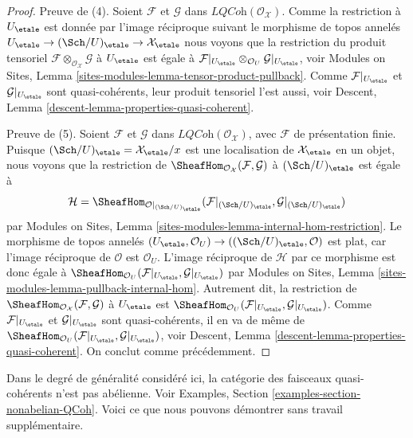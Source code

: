 \begin{proof}
\medskip\noindent
Preuve de (4). Soient $\mathcal{F}$ et $\mathcal{G}$ dans
$\textit{LQCoh}(\mathcal{O}_\mathcal{X})$. Comme la restriction à $U_\etale$
est donnée par l'image réciproque suivant le morphisme de topos annelés
$U_\etale \to (\Sch/U)_\etale \to \mathcal{X}_\etale$
nous voyons que la restriction du produit tensoriel
$\mathcal{F} \otimes_{\mathcal{O}_\mathcal{X}} \mathcal{G}$
à $U_\etale$ est égale à
$\mathcal{F}|_{U_\etale} \otimes_{\mathcal{O}_U} \mathcal{G}|_{U_\etale}$,
voir Modules on Sites, Lemma \ref{sites-modules-lemma-tensor-product-pullback}.
Comme $\mathcal{F}|_{U_\etale}$ et $\mathcal{G}|_{U_\etale}$
sont quasi-cohérents, leur produit tensoriel l'est aussi, voir
Descent, Lemma \ref{descent-lemma-properties-quasi-coherent}.

\medskip\noindent
Preuve de (5). Soient $\mathcal{F}$ et $\mathcal{G}$ dans
$\textit{LQCoh}(\mathcal{O}_\mathcal{X})$, avec $\mathcal{F}$
de présentation finie. Puisque
$(\Sch/U)_\etale = \mathcal{X}_\etale/x$
est une localisation de $\mathcal{X}_\etale$ en un objet,
nous voyons que la restriction de
$\SheafHom_{\mathcal{O}_\mathcal{X}}(\mathcal{F}, \mathcal{G})$
à $(\Sch/U)_\etale$ est égale à
$$
\mathcal{H} =
\SheafHom_{\mathcal{O}|_{(\Sch/U)_\etale}}(
\mathcal{F}|_{(\Sch/U)_\etale}, \mathcal{G}|_{(\Sch/U)_\etale})
$$
par Modules on Sites, Lemma \ref{sites-modules-lemma-internal-hom-restriction}.
Le morphisme de topos annelés
$(U_\etale, \mathcal{O}_U) \to ((\Sch/U)_\etale, \mathcal{O})$
est plat, car l'image réciproque de $\mathcal{O}$ est $\mathcal{O}_U$.
L'image réciproque de $\mathcal{H}$ par ce morphisme est donc égale à
$\SheafHom_{\mathcal{O}_U}(\mathcal{F}|_{U_\etale}, \mathcal{G}|_{U_\etale})$
par Modules on Sites, Lemma \ref{sites-modules-lemma-pullback-internal-hom}.
Autrement dit, la restriction de
$\SheafHom_{\mathcal{O}_\mathcal{X}}(\mathcal{F}, \mathcal{G})$
à $U_\etale$ est
$\SheafHom_{\mathcal{O}_U}(\mathcal{F}|_{U_\etale}, \mathcal{G}|_{U_\etale})$.
Comme $\mathcal{F}|_{U_\etale}$ et $\mathcal{G}|_{U_\etale}$
sont quasi-cohérents, il en va de même de
$\SheafHom_{\mathcal{O}_U}(\mathcal{F}|_{U_\etale}, \mathcal{G}|_{U_\etale})$,
voir Descent, Lemma \ref{descent-lemma-properties-quasi-coherent}.
On conclut comme précédemment.
\end{proof}

\noindent
Dans le degré de généralité considéré ici, la catégorie des faisceaux quasi-cohérents
n'est pas abélienne. Voir Examples, Section \ref{examples-section-nonabelian-QCoh}.
Voici ce que nous pouvons démontrer sans travail supplémentaire.


